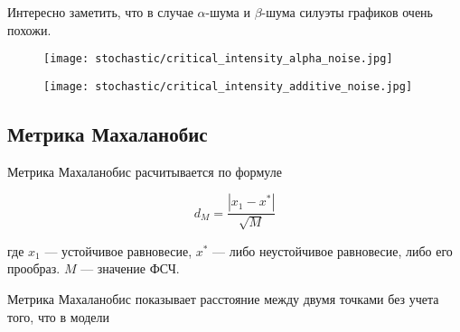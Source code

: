         Интересно заметить, что в случае \(\alpha\)-шума и \(\beta\)-шума силуэты графиков очень похожи.

        \begin{figure}
            \centering
            \texttt{[image: stochastic/critical\_intensity\_alpha\_noise.jpg]}
        
            \captionsetup{justification=centering}
            \caption{}
            \label{critical_intensity_alpha_noise}
        \end{figure}

        \begin{figure}
            \centering
            \texttt{[image: stochastic/critical\_intensity\_additive\_noise.jpg]}
        
            \captionsetup{justification=centering}
            \caption{}
            \label{critical_intensity_additive_noise}
        \end{figure}


    \subsection{Метрика Махаланобис}
        

        Метрика Махаланобис расчитывается по формуле 

        \[
            d_M = \frac{|x_1 - x^*|}{\sqrt{M}}
        \]
        
        где \(x_1\) --- устойчивое равновесие, \(x^*\) --- либо неустойчивое равновесие, либо его прообраз. \(M\) --- значение ФСЧ.

        Метрика Махаланобис показывает расстояние между двумя точками без учета того, что в модели 


